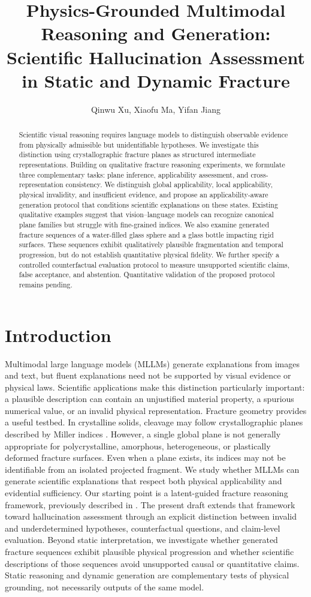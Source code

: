 \documentclass[11pt]{article}
\title{Physics-Grounded Multimodal Reasoning and Generation: Scientific Hallucination Assessment in Static and Dynamic Fracture}
\author{Qinwu Xu, Xiaofu Ma, Yifan Jiang}
\begin{document}
\maketitle
\begin{abstract}
Scientific visual reasoning requires language models to distinguish observable evidence from physically admissible but unidentifiable hypotheses. We investigate this distinction using crystallographic fracture planes as structured intermediate representations. Building on qualitative fracture reasoning experiments, we formulate three complementary tasks: plane inference, applicability assessment, and cross-representation consistency. We distinguish global applicability, local applicability, physical invalidity, and insufficient evidence, and propose an applicability-aware generation protocol that conditions scientific explanations on these states. Existing qualitative examples suggest that vision--language models can recognize canonical plane families but struggle with fine-grained indices. We also examine generated fracture sequences of a water-filled glass sphere and a glass bottle impacting rigid surfaces. These sequences exhibit qualitatively plausible fragmentation and temporal progression, but do not establish quantitative physical fidelity. We further specify a controlled counterfactual evaluation protocol to measure unsupported scientific claims, false acceptance, and abstention. Quantitative validation of the proposed protocol remains pending.
\end{abstract}
\section{Introduction}
Multimodal large language models (MLLMs) generate explanations from images and text, but fluent explanations need not be supported by visual evidence or physical laws. Scientific applications make this distinction particularly important: a plausible description can contain an unjustified material property, a spurious numerical value, or an invalid physical representation.
Fracture geometry provides a useful testbed. In crystalline solids, cleavage may follow crystallographic planes described by Miller indices \citep{cullity2001,anderson2017}. However, a single global plane is not generally appropriate for polycrystalline, amorphous, heterogeneous, or plastically deformed fracture surfaces. Even when a plane exists, its indices may not be identifiable from an isolated projected fragment.
We study whether MLLMs can generate scientific explanations that respect both physical applicability and evidential sufficiency. Our starting point is a latent-guided fracture reasoning framework, previously described in \citep{xu2026miller}. The present draft extends that framework toward hallucination assessment through an explicit distinction between invalid and underdetermined hypotheses, counterfactual questions, and claim-level evaluation.
Beyond static interpretation, we investigate whether generated fracture sequences exhibit plausible physical progression and whether scientific descriptions of those sequences avoid unsupported causal or quantitative claims. Static reasoning and dynamic generation are complementary tests of physical grounding, not necessarily outputs of the same model.
\end{document}
